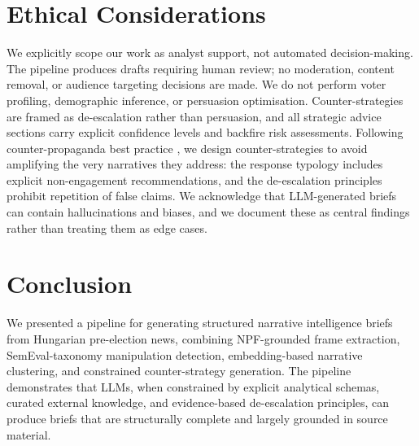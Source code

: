 \documentclass[10pt, a4paper]{article}
\begin{document}


\section{Ethical Considerations}
\label{sec:ethics}

We explicitly scope our work as analyst support, not automated decision-making. The pipeline produces drafts requiring human review; no moderation, content removal, or audience targeting decisions are made. We do not perform voter profiling, demographic inference, or persuasion optimisation. Counter-strategies are framed as de-escalation rather than persuasion, and all strategic advice sections carry explicit confidence levels and backfire risk assessments. Following counter-propaganda best practice \citep{resist2019, ran2022alternative}, we design counter-strategies to avoid amplifying the very narratives they address: the response typology includes explicit non-engagement recommendations, and the de-escalation principles prohibit repetition of false claims. We acknowledge that LLM-generated briefs can contain hallucinations and biases, and we document these as central findings rather than treating them as edge cases.


\section{Conclusion}
\label{sec:conclusion}

We presented a pipeline for generating structured narrative intelligence briefs from Hungarian pre-election news, combining NPF-grounded frame extraction, SemEval-taxonomy manipulation detection, embedding-based narrative clustering, and constrained counter-strategy generation. The pipeline demonstrates that LLMs, when constrained by explicit analytical schemas, curated external knowledge, and evidence-based de-escalation principles, can produce briefs that are structurally complete and largely grounded in source material.
\end{document}
